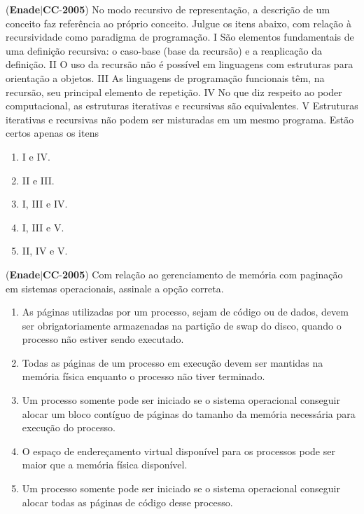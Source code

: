 \documentclass{exam}
\begin{document}
\begin{questions}
\question (\textbf{Enade}$|$\textbf{CC}-\textbf{2005}) No modo recursivo de representação, a descrição de um
conceito faz referência ao próprio conceito. Julgue os itens
abaixo, com relação à recursividade como paradigma de
programação.
I São elementos fundamentais de uma definição recursiva:
o caso-base (base da recursão) e a reaplicação da definição.
II O uso da recursão não é possível em linguagens com
estruturas para orientação a objetos.
III As linguagens de programação funcionais têm, na recursão,
seu principal elemento de repetição.
IV No que diz respeito ao poder computacional, as estruturas
iterativas e recursivas são equivalentes.
V Estruturas iterativas e recursivas não podem ser misturadas
em um mesmo programa.
Estão certos apenas os itens
	\begin{enumerate}[label=\alph*)]
		\item  I e IV.
		\item  II e III.
		\item  I, III e IV.
		\item  I, III e V.
		\item  II, IV e V.

	\end{enumerate}

\question (\textbf{Enade}$|$\textbf{CC}-\textbf{2005}) Com relação ao gerenciamento de memória com paginação em
sistemas operacionais, assinale a opção correta.
	\begin{enumerate}[label=\alph*)]
		\item  As páginas utilizadas por um processo, sejam de código ou de
dados, devem ser obrigatoriamente armazenadas na partição de
swap do disco, quando o processo não estiver sendo executado.
		\item  Todas as páginas de um processo em execução devem ser
mantidas na memória física enquanto o processo não tiver
terminado.
		\item  Um processo somente pode ser iniciado se o sistema
operacional conseguir alocar um bloco contíguo de páginas do
tamanho da memória necessária para execução do processo.
		\item  O espaço de endereçamento virtual disponível para os processos
pode ser maior que a memória física disponível.
		\item  Um processo somente pode ser iniciado se o sistema
operacional conseguir alocar todas as páginas de código
desse processo.

	\end{enumerate}


\end{questions}
\end{document}
